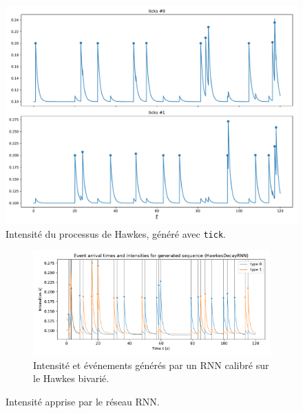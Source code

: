 \documentclass{beamer}
\begin{document}
\begin{frame}
\begin{figure}
	\includegraphics[width=\linewidth]{../results/intensity_baseHawkes2D.pdf}
	\caption{Intensité du processus de Hawkes, généré avec \texttt{tick}.}
\end{figure}
\end{frame}

\begin{frame}
\begin{figure}
	\begin{subfigure}{\linewidth}
		\includegraphics[width=\linewidth]{../results/intensity_HawkesDecayRNN_2d_hidden128_20181209-132014.pdf}
		\caption{Intensité et événements générés par un RNN calibré sur le Hawkes bivarié.}
	\end{subfigure}
	\caption{Intensité apprise par le réseau RNN.}
\end{figure}
\end{frame}
\end{document}
